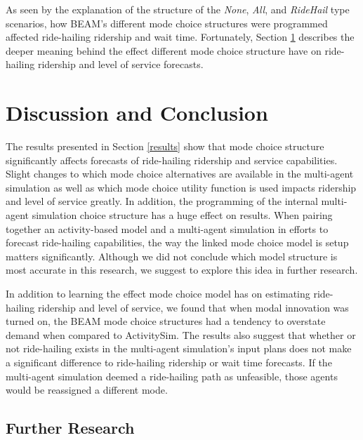 \documentclass[fancy, masters]{byuthesis}
\begin{document}
As seen by the explanation of the structure of the \emph{None}, \emph{All}, and \emph{RideHail} type scenarios, how BEAM's different mode choice structures were programmed affected ride-hailing ridership and wait time. Fortunately, Section \ref{discussion} describes the deeper meaning behind the effect different mode choice structure have on ride-hailing ridership and level of service forecasts.

\hypertarget{discussion}{%
\chapter{Discussion and Conclusion}\label{discussion}}

The results presented in Section \ref{results} show that mode choice structure significantly affects forecasts of ride-hailing ridership and service capabilities. Slight changes to which mode choice alternatives are available in the multi-agent simulation as well as which mode choice utility function is used impacts ridership and level of service greatly. In addition, the programming of the internal multi-agent simulation choice structure has a huge effect on results. When pairing together an activity-based model and a multi-agent simulation in efforts to forecast ride-hailing capabilities, the way the linked mode choice model is setup matters significantly. Although we did not conclude which model structure is most accurate in this research, we suggest to explore this idea in further research.

In addition to learning the effect mode choice model has on estimating ride-hailing ridership and level of service, we found that when modal innovation was turned on, the BEAM mode choice structures had a tendency to overstate demand when compared to ActivitySim. The results also suggest that whether or not ride-hailing exists in the multi-agent simulation's input plans does not make a significant difference to ride-hailing ridership or wait time forecasts. If the multi-agent simulation deemed a ride-hailing path as unfeasible, those agents would be reassigned a different mode.

\hypertarget{further-research}{%
\section{Further Research}\label{further-research}}
\end{document}
